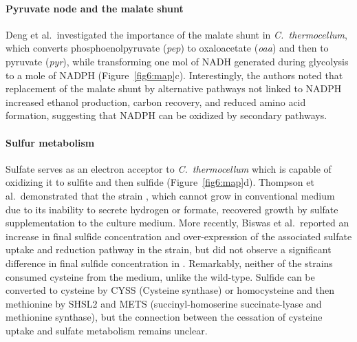 \paragraph{Pyruvate node and the malate shunt}
Deng et al.\citep{deng2013}\ investigated the importance of the malate shunt in \textit{C.~thermocellum}, which converts phosphoenolpyruvate (\textit{pep}) to oxaloacetate (\textit{oaa}) and then to pyruvate (\textit{pyr}), while transforming one mol of NADH generated during glycolysis to a mole of NADPH (Figure~\ref{fig6:map}c). Interestingly, the authors noted that replacement of the malate shunt by alternative pathways not linked to NADPH increased ethanol production, carbon recovery, and reduced amino acid formation, suggesting that NADPH can be oxidized by secondary pathways.

\paragraph{Sulfur metabolism}
Sulfate serves as an electron acceptor to \textit{C.~thermocellum} which is capable of oxidizing it to sulfite and then sulfide (Figure~\ref{fig6:map}d).
Thompson et al.\citep{thompson2015}\ demonstrated that the strain , which cannot grow in conventional medium due to its inability to secrete hydrogen or formate, recovered growth by sulfate supplementation to the culture medium.
More recently, Biswas et al.\citep{biswas2017}\ reported an increase in final sulfide concentration and over-expression of the associated sulfate uptake and reduction pathway in the  strain, but did not observe a significant difference in final sulfide concentration in .
Remarkably, neither of the strains consumed cysteine from the medium, unlike the wild-type.
Sulfide can be converted to cysteine by CYSS (Cysteine synthase) or homocysteine and then methionine by SHSL2 and METS (succinyl-homoserine succinate-lyase and methionine synthase), but the connection between the cessation of cysteine uptake and sulfate metabolism remains unclear.



